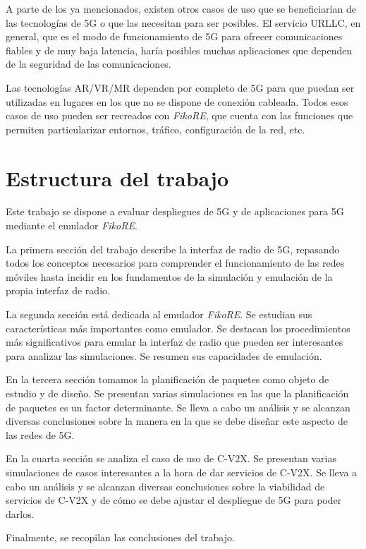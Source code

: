 \documentclass[12pt]{report} %
\begin{document}
A parte de los ya mencionados, existen otros casos de uso que se beneficiarían de las tecnologías de 5G o que las necesitan para ser posibles.
El servicio URLLC, en general, que es el modo de funcionamiento de 5G para ofrecer comunicaciones fiables y de muy baja latencia,
haría posibles muchas aplicaciones que dependen de la seguridad de las comunicaciones.

Las tecnologías AR/VR/MR dependen por completo de 5G para que puedan ser utilizadas en lugares en los que no se dispone de conexión cableada.
\cite{RefWorks:24}
Todos esos casos de uso pueden ser recreados con \textit{FikoRE}, que cuenta con las funciones que permiten particularizar entornos, tráfico, configuración de la red, etc.

\section{Estructura del trabajo}

Este trabajo se dispone a evaluar despliegues de 5G y de aplicaciones para 5G mediante el emulador \textit{FikoRE}.

La primera sección del trabajo describe la interfaz de radio de 5G, repasando todos los conceptos necesarios para comprender el funcionamiento de las redes móviles hasta incidir en los fundamentos de la simulación y emulación de la propia interfaz de radio.

La segunda sección está dedicada al emulador \textit{FikoRE}.
Se estudian sus características más importantes como emulador.
Se destacan los procedimientos más significativos para emular la interfaz de radio que pueden ser interesantes para analizar las simulaciones.
Se resumen sus capacidades de emulación.

En la tercera sección tomamos la planificación de paquetes como objeto de estudio y de diseño.
Se presentan varias simulaciones en las que la planificación de paquetes es un factor determinante.
Se lleva a cabo un análisis y se alcanzan diversas conclusiones sobre la manera en la que se debe diseñar este aspecto de las redes de 5G.

En la cuarta sección se analiza el caso de uso de C-V2X.
Se presentan varias simulaciones de casos interesantes a la hora de dar servicios de C-V2X.
Se lleva a cabo un análisis y se alcanzan diversas conclusiones sobre la viabilidad de servicios de C-V2X y de cómo se debe ajustar el despliegue de 5G para poder darlos.

Finalmente, se recopilan las conclusiones del trabajo.
\end{document}
